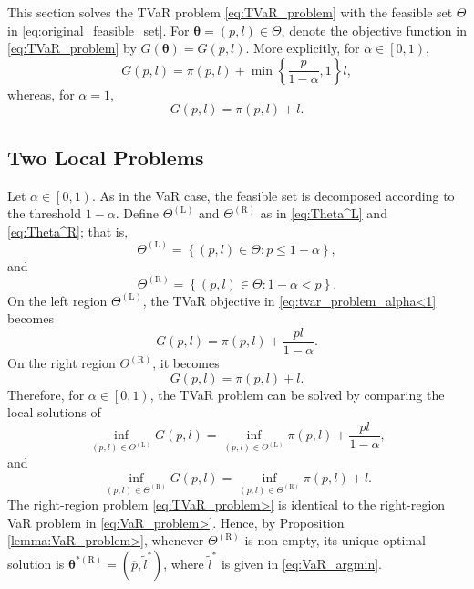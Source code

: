 \documentclass[a4paper,12pt]{article}
\begin{document}
This section solves the TVaR problem \eqref{eq:TVaR_problem} with the feasible set $\Theta$ in \eqref{eq:original_feasible_set}. For ${\bm\theta}=\left(p,l\right)\in\Theta$, denote the objective function in \eqref{eq:TVaR_problem} by $G\left({\bm\theta}\right)=G\left(p,l\right)$. More explicitly, for $\alpha\in\left[0,1\right)$,
\begin{equation}
G\left(p,l\right)=\pi\left(p,l\right)+\min\left\{\frac{p}{1-\alpha},1\right\}l,
\label{eq:tvar_problem_alpha<1}
\end{equation}
whereas, for $\alpha=1$,
\begin{equation}
G\left(p,l\right)=\pi\left(p,l\right)+l.
\label{eq:tvar_problem_alpha=1}
\end{equation}

\subsection{Two Local Problems}

Let $\alpha\in\left[0,1\right)$. As in the VaR case, the feasible set is decomposed according to the threshold $1-\alpha$. Define $\Theta^{\left(\text{L}\right)}$ and $\Theta^{\left(\text{R}\right)}$ as in \eqref{eq:Theta^L} and \eqref{eq:Theta^R}; that is,
\begin{equation*}
\Theta^{\left(\text{L}\right)}=\left\{\left(p,l\right)\in\Theta:p\leq 1-\alpha\right\},
\end{equation*}
and
\begin{equation*}
\Theta^{\left(\text{R}\right)}=\left\{\left(p,l\right)\in\Theta:1-\alpha<p\right\}.
\end{equation*}
On the left region $\Theta^{\left(\text{L}\right)}$, the TVaR objective in \eqref{eq:tvar_problem_alpha<1} becomes
\begin{equation*}
G\left(p,l\right)=\pi\left(p,l\right)+\frac{pl}{1-\alpha}.
\end{equation*}
On the right region $\Theta^{\left(\text{R}\right)}$, it becomes
\begin{equation*}
G\left(p,l\right)=\pi\left(p,l\right)+l.
\end{equation*}
Therefore, for $\alpha\in\left[0,1\right)$, the TVaR problem can be solved by comparing the local solutions of
\begin{equation}
\inf_{\left(p,l\right)\in\Theta^{\left(\text{L}\right)}}G\left(p,l\right)=\inf_{\left(p,l\right)\in\Theta^{\left(\text{L}\right)}}\pi\left(p,l\right)+\frac{pl}{1-\alpha},
\label{eq:TVaR_problem<=}
\end{equation}
and
\begin{equation}
\inf_{\left(p,l\right)\in\Theta^{\left(\text{R}\right)}}G\left(p,l\right)=\inf_{\left(p,l\right)\in\Theta^{\left(\text{R}\right)}}\pi\left(p,l\right)+l.
\label{eq:TVaR_problem>}
\end{equation}
\noindent
The right-region problem \eqref{eq:TVaR_problem>} is identical to the right-region VaR problem in \eqref{eq:VaR_problem>}. Hence, by Proposition \ref{lemma:VaR_problem>}, whenever $\Theta^{\left(\text{R}\right)}$ is non-empty, its unique optimal solution is
${\bm\theta}^{*\left(\text{R}\right)}=\left(\overline{p},\tilde{l}^*\right)$, where $\tilde{l}^*$ is given in \eqref{eq:VaR_argmin}.
\end{document}
